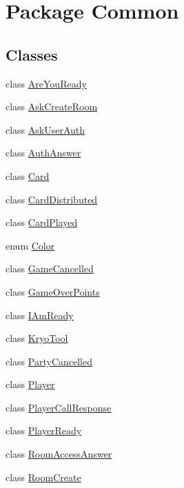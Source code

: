 \hypertarget{namespaceCommon}{}\section{Package Common}
\label{namespaceCommon}
\subsection*{Classes}
\begin{DoxyCompactItemize}
\item 
class \mbox{\hyperlink{classCommon_1_1AreYouReady}{Are\+You\+Ready}}
\item 
class \mbox{\hyperlink{classCommon_1_1AskCreateRoom}{Ask\+Create\+Room}}
\item 
class \mbox{\hyperlink{classCommon_1_1AskUserAuth}{Ask\+User\+Auth}}
\item 
class \mbox{\hyperlink{classCommon_1_1AuthAnswer}{Auth\+Answer}}
\item 
class \mbox{\hyperlink{classCommon_1_1Card}{Card}}
\item 
class \mbox{\hyperlink{classCommon_1_1CardDistributed}{Card\+Distributed}}
\item 
class \mbox{\hyperlink{classCommon_1_1CardPlayed}{Card\+Played}}
\item 
enum \mbox{\hyperlink{enumCommon_1_1Color}{Color}}
\item 
class \mbox{\hyperlink{classCommon_1_1GameCancelled}{Game\+Cancelled}}
\item 
class \mbox{\hyperlink{classCommon_1_1GameOverPoints}{Game\+Over\+Points}}
\item 
class \mbox{\hyperlink{classCommon_1_1IAmReady}{I\+Am\+Ready}}
\item 
class \mbox{\hyperlink{classCommon_1_1KryoTool}{Kryo\+Tool}}
\item 
class \mbox{\hyperlink{classCommon_1_1PartyCancelled}{Party\+Cancelled}}
\item 
class \mbox{\hyperlink{classCommon_1_1Player}{Player}}
\item 
class \mbox{\hyperlink{classCommon_1_1PlayerCallResponse}{Player\+Call\+Response}}
\item 
class \mbox{\hyperlink{classCommon_1_1PlayerReady}{Player\+Ready}}
\item 
class \mbox{\hyperlink{classCommon_1_1RoomAccessAnswer}{Room\+Access\+Answer}}
\item 
class \mbox{\hyperlink{classCommon_1_1RoomCreate}{Room\+Create}}
\item 

\end{DoxyCompactItemize}

